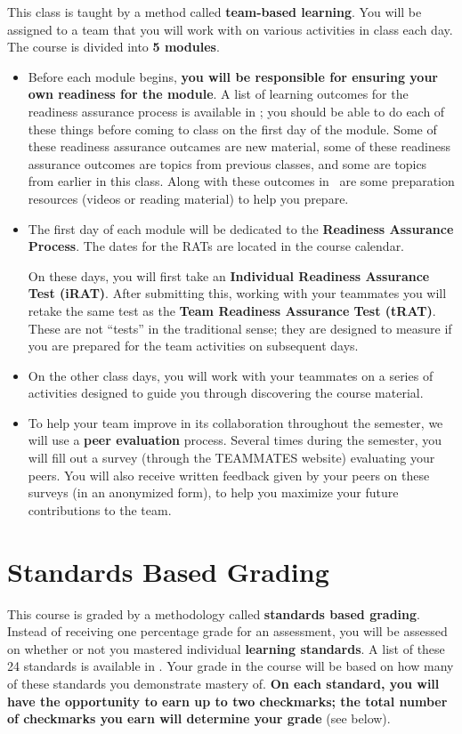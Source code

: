 \documentclass{article}
\begin{document}
    This class is taught by a method called {\bf team-based learning}.  You will be assigned to a team that you will work with on various activities in class each day.  The course is divided into {\bf 5 modules}.
    \begin{itemize}
    \item Before each module begins, {\bf you will be responsible for ensuring your own readiness for the module}.  A list of learning outcomes for the readiness assurance process is available in \LMS; you should be able to do each of these things before coming to class on the first day of the module.  Some of these readiness assurance outcames are new material, some of these readiness assurance outcomes are topics from previous classes, and some are topics from earlier in this class.  Along with these outcomes in \LMS\ are some preparation resources (videos or reading material) to help you prepare.
    \item The first day of each module will be dedicated to the {\bf Readiness Assurance Process}.  The dates for the RATs are located in the course calendar.


    On these days, you will first take an {\bf Individual Readiness Assurance Test (iRAT)}.  After submitting this, working with your teammates you will retake the same test as the {\bf Team Readiness Assurance Test (tRAT)}.  These are not ``tests'' in the traditional sense; they are designed to measure if you are prepared for the team activities on subsequent days.

    \item On the other class days, you will work with your teammates on a series of activities designed to guide you through discovering the course material.

    \item To help your team improve in its collaboration throughout the semester, we will use a {\bf peer evaluation} process.  Several times during the semester, you will fill out a  survey (through the TEAMMATES website) evaluating your peers.  
    You will also receive written feedback given by your peers on these surveys (in an anonymized form), to help you maximize your future contributions to the team.

    \end{itemize}


\section*{\fontsize{12}{15}\selectfont Standards Based Grading}
This course is graded by a methodology called {\bf standards based grading}.  Instead of receiving one percentage grade for an assessment, you will be assessed on whether or not you mastered individual {\bf learning standards}.  A list of these 24 standards is available in \LMS.  Your grade in the course will be based on how many of these standards you demonstrate mastery of.  {\bf On each standard, you will have the opportunity to earn up to two checkmarks; the total number of checkmarks you earn will determine your grade} (see below).
\end{document}
